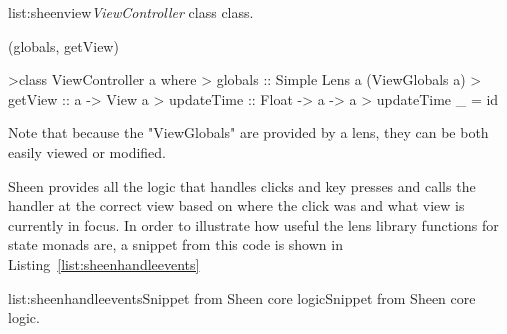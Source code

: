\vspace{-0.5em}
\begin{listing}{list:sheenview}{\emph{ViewController} class}{ class.}{}
\end{listing}\vspace{-1.5em}

\functions(globals, getView)
\begin{haskell}

>class ViewController a where
>  globals :: Simple Lens a (ViewGlobals a)
>  getView :: a -> View a
>  updateTime :: Float -> a -> a
>  updateTime _ = id

\end{haskell}
\noindent 
Note that because the "ViewGlobals" are provided by a lens, they can be both easily viewed or modified. 

Sheen provides all the logic that handles clicks and key presses and calls the handler at the correct view based on where the click was and what view is currently in focus. In order to illustrate how useful the lens library functions for state monads are, a snippet from this code is shown in Listing~\ref{list:sheenhandleevents}

\vspace{-0.5em}
\begin{listing}{list:sheenhandleevents}{Snippet from Sheen core logic}{Snippet from Sheen core logic.}{}
\end{listing}\vspace{-1.5em}

